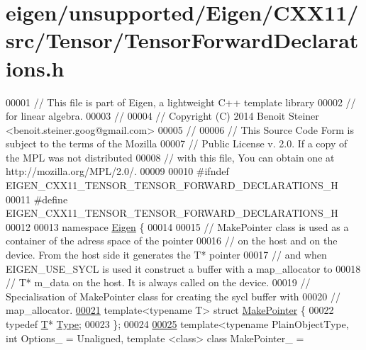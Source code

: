 \hypertarget{eigen_2unsupported_2_eigen_2_c_x_x11_2src_2_tensor_2_tensor_forward_declarations_8h_source}{}\section{eigen/unsupported/\+Eigen/\+C\+X\+X11/src/\+Tensor/\+Tensor\+Forward\+Declarations.h}
\label{eigen_2unsupported_2_eigen_2_c_x_x11_2src_2_tensor_2_tensor_forward_declarations_8h_source}

\begin{DoxyCode}
00001 \textcolor{comment}{// This file is part of Eigen, a lightweight C++ template library}
00002 \textcolor{comment}{// for linear algebra.}
00003 \textcolor{comment}{//}
00004 \textcolor{comment}{// Copyright (C) 2014 Benoit Steiner <benoit.steiner.goog@gmail.com>}
00005 \textcolor{comment}{//}
00006 \textcolor{comment}{// This Source Code Form is subject to the terms of the Mozilla}
00007 \textcolor{comment}{// Public License v. 2.0. If a copy of the MPL was not distributed}
00008 \textcolor{comment}{// with this file, You can obtain one at http://mozilla.org/MPL/2.0/.}
00009 
00010 \textcolor{preprocessor}{#ifndef EIGEN\_CXX11\_TENSOR\_TENSOR\_FORWARD\_DECLARATIONS\_H}
00011 \textcolor{preprocessor}{#define EIGEN\_CXX11\_TENSOR\_TENSOR\_FORWARD\_DECLARATIONS\_H}
00012 
00013 \textcolor{keyword}{namespace }\hyperlink{namespace_eigen}{Eigen} \{
00014 
00015 \textcolor{comment}{// MakePointer class is used as a container of the adress space of the pointer}
00016 \textcolor{comment}{// on the host and on the device. From the host side it generates the T* pointer}
00017 \textcolor{comment}{// and when EIGEN\_USE\_SYCL is used it construct a buffer with a map\_allocator to}
00018 \textcolor{comment}{// T* m\_data on the host. It is always called on the device.}
00019 \textcolor{comment}{// Specialisation of MakePointer class for creating the sycl buffer with}
00020 \textcolor{comment}{// map\_allocator.}
\hyperlink{struct_eigen_1_1_make_pointer}{00021} \textcolor{keyword}{template}<\textcolor{keyword}{typename} T> \textcolor{keyword}{struct }\hyperlink{struct_eigen_1_1_make_pointer}{MakePointer} \{
00022   \textcolor{keyword}{typedef} \hyperlink{group___sparse_core___module}{T}* \hyperlink{group___sparse_core___module}{Type};
00023 \};
00024 
\hyperlink{class_eigen_1_1_tensor_map}{00025} \textcolor{keyword}{template}<\textcolor{keyword}{typename} PlainObjectType, \textcolor{keywordtype}{int} Options\_ = Unaligned, \textcolor{keyword}{template} <\textcolor{keyword}{class}> \textcolor{keyword}{class }MakePointer\_ = 

\end{DoxyCode}
